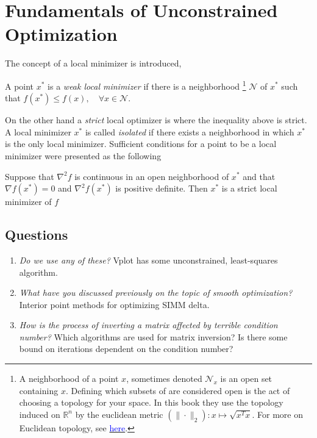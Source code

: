 \newpage
\section{Fundamentals of Unconstrained Optimization}
The concept of a local minimizer is introduced,
\begin{Def}
    A point $x^*$ is a \textit{weak local minimizer} if there is a neighborhood
    \footnote{
        A neighborhood of a point $x$, sometimes denoted $\mathcal{N}_x$ is an open set containing $x$.
        Defining which subsets of are considered open is the act of choosing a topology for your space.
        In this book they use the topology induced on $\mathbb{R}^n$ by the euclidean metric $\left( \| \cdot\|_2\right) : x \mapsto \sqrt{x^Tx}$.
        For more on Euclidean topology, see \href{https://en.wikipedia.org/wiki/Real_coordinate_space\#Topological_properties}{\textcolor{blue}{here}}.
    }
    $\mathcal{N}$ of $x^*$ such that $f\left(x^*\right) \leq f(x), \quad\forall x\in\mathcal{N}$.
\end{Def}
On the other hand a \textit{strict} local optimizer is where the inequality above is strict.
A local minimizer $x^*$ is called \textit{isolated} if there exists a neighborhood in which $x^*$ is the only local minimizer.
Sufficient conditions for a point to be a local minimizer were presented as the following
\begin{Thm}
    Suppose that $\nabla^2f$ is continuous in an open neighborhood of $x^*$ and that $\nabla f(x^*) = 0$ and $\nabla^2f(x^*)$ is positive definite. Then $x^*$ is a strict local minimizer of $f$
\end{Thm}
\subsection{Questions}
\begin{enumerate}[label = \roman*)]
    \item \textit{Do we use any of these?} Vplot has some unconstrained, least-squares algorithm.
    \item \textit{What have you discussed previously on the topic of smooth optimization?} Interior point methods for optimizing SIMM delta.
    \item \textit{How is the process of inverting a matrix affected by terrible condition number?} Which algorithms are used for matrix inversion? Is there some bound on iterations dependent on the condition number?
\end{enumerate}
